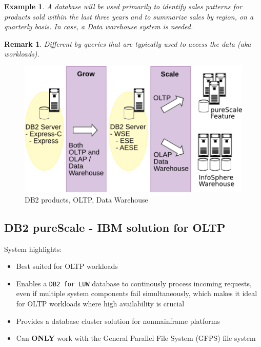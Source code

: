 \documentclass{article}
\newtheorem*{remark}{Remark}
\newtheorem{example}{Example}
\begin{document}
\begin{example}
A database will be used primarily to identify sales patterns for products sold within the 
last three years and to summarize sales by region, on a quarterly basis. In case, a Data warehouse 
system is needed.
\end{example}

\begin{remark}
Different by {\color{red} queries that are typically used to access the data} (aka workloads).
\end{remark}


\begin{figure}[h]
\centering
\includegraphics[scale=0.4]{workloads.png}
 
\caption{DB2 products, OLTP, Data Warehouse}
\label{workloads}
\end{figure}

\subsection{DB2 pureScale - IBM solution for OLTP}
\label{DB2 pureScale}

\medskip

System highlights:
\begin{itemize}
\item Best suited for OLTP workloads
\item Enables a \texttt{DB2 for LUW} database to continously process incoming requests, even if
multiple system components fail simultaneously, which makes it ideal for OLTP workloads where high
availability is crucial
\item Provides a database cluster solution for nonmainframe platforms
\item Can \textbf{ONLY} work with the General Parallel File System (GFPS) file system
\end{itemize}
\end{document}
